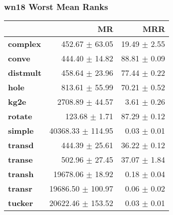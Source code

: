 \documentclass{article}
\begin{document}
\subsubsection{wn18 Worst Mean Ranks}
    \begin{center}
    \begin{tabular}{lrr}
\toprule
{} &                 MR &           MRR \\
\midrule
\textbf{complex } &     452.67 $\pm$ 63.05 &  19.49 $\pm$ 2.55 \\
\textbf{conve   } &     444.40 $\pm$ 14.82 &  88.81 $\pm$ 0.09 \\
\textbf{distmult} &     458.64 $\pm$ 23.96 &  77.44 $\pm$ 0.22 \\
\textbf{hole    } &     813.61 $\pm$ 55.99 &  70.21 $\pm$ 0.52 \\
\textbf{kg2e    } &    2708.89 $\pm$ 44.57 &   3.61 $\pm$ 0.26 \\
\textbf{rotate  } &      123.68 $\pm$ 1.71 &  87.29 $\pm$ 0.12 \\
\textbf{simple  } &  40368.33 $\pm$ 114.95 &   0.03 $\pm$ 0.01 \\
\textbf{transd  } &     444.39 $\pm$ 25.61 &  36.22 $\pm$ 0.12 \\
\textbf{transe  } &     502.96 $\pm$ 27.45 &  37.07 $\pm$ 1.84 \\
\textbf{transh  } &   19678.06 $\pm$ 18.92 &   0.18 $\pm$ 0.04 \\
\textbf{transr  } &  19686.50 $\pm$ 100.97 &   0.06 $\pm$ 0.02 \\
\textbf{tucker  } &  20622.46 $\pm$ 153.52 &   0.03 $\pm$ 0.01 \\
\bottomrule
\end{tabular}

    \end{center}
\end{document}
